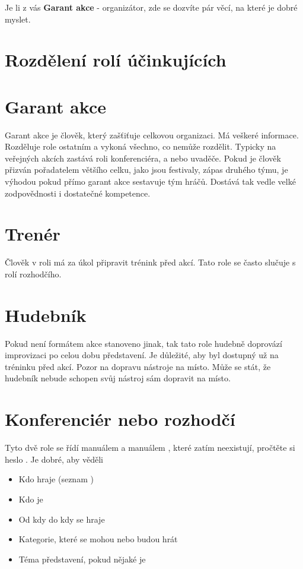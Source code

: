 \needspace{5cm} \label{příprava zápasu} Je li z vás \textbf{Garant akce}{} - organizátor, zde se dozvíte pár věcí, na které je dobré myslet. 
\section{Rozdělení rolí účinkujících} \section{Garant akce} Garant akce je člověk, který zašťiťuje celkovou organizaci. Má veškeré informace. Rozděluje role ostatním a vykoná všechno, co nemůže rozdělit. Typicky na veřejných akcích zastává roli konferenciéra, a nebo uvaděče. Pokud je člověk přizván pořadatelem většího celku, jako jsou festivaly, zápas druhého týmu, je výhodou pokud přímo garant akce sestavuje tým hráčů. Dostává tak vedle velké zodpovědnosti i dostatečné kompetence. 
 
\section{Trenér} Člověk v roli  má za úkol připravit trénink před akcí. Tato role se často slučuje s rolí rozhodčího. 
\section{Hudebník} Pokud není formátem akce stanoveno jinak, tak tato role hudebně doprovází improvizaci po celou dobu představení. 
Je důležité, aby byl  dostupný už na tréninku před akcí. 
Pozor na dopravu nástroje na místo. Může se stát, že hudebník nebude schopen svůj nástroj sám dopravit na místo. 
 
\section{Konferenciér nebo rozhodčí} Tyto dvě role se řídí manuálem  a manuálem , které zatím neexistují, pročtěte si heslo . 
Je dobré, aby věděli 
\begin{itemize}
\item Kdo hraje (seznam )
\item Kdo je 
\item Od kdy do kdy se hraje
\item Kategorie, které se mohou nebo budou hrát
\item Téma představení, pokud nějaké je
\end{itemize}
